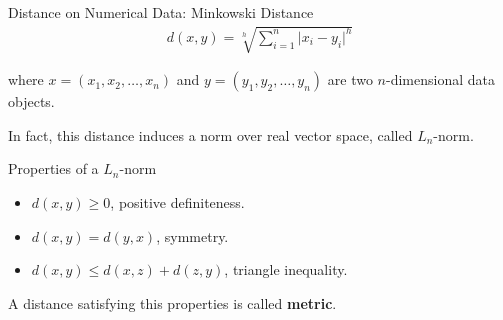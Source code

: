 \begin{frame}{Distance on Numerical Data: Minkowski Distance}
  \vspace{-1.5em}
  \begin{align*}
    d(x,y) = \sqrt[h]{\sum_{i=1}^{n} \vert x_i-y_i \vert^h}
  \end{align*}

  where $x = (x_1,x_2, \ldots, x_n)$ and $y = (y_1,y_2,\ldots,y_n)$ are two $n$-dimensional data objects.

  In fact, this distance induces a norm over real vector space, called $L_n$-norm.

  \begin{block}{Properties of a $L_n$-norm}
    \begin{itemize}
    \item $d(x,y) \geq 0$, positive definiteness.
    \item $d(x,y) = d(y,x)$, symmetry.
    \item $d(x,y) \leq d(x,z) + d(z,y)$, triangle inequality.
    \end{itemize}

    A distance satisfying this properties is called \textbf{metric}.
  \end{block}
\end{frame}

